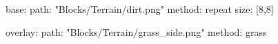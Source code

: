 base:
  path: "Blocks/Terrain/dirt.png"
  method: repeat
  size: [8,8]

overlay:
  path: "Blocks/Terrain/grass_side.png"
  method: grass